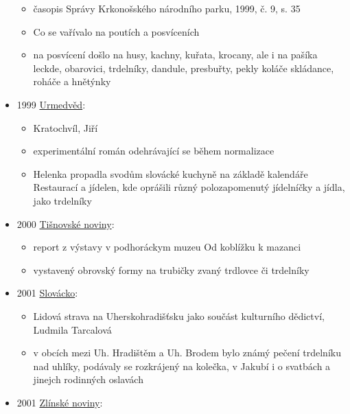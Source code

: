 \begin{itemize}
  \begin{itemize}
  \tightlist
  \item
    časopis Správy Krkonošského národního parku, 1999, č. 9, s. 35
  \item
    Co se vařívalo na poutích a posvíceních
  \item
    na posvícení došlo na husy, kachny, kuřata, krocany, ale i na pašíka
    leckde, obarovici, trdelníky, dandule, presbuřty, pekly koláče
    skládance, roháče a hnětýnky
  \end{itemize}
\item
  1999
  \href{https://ceskadigitalniknihovna.cz/uuid/uuid:b931b0f0-a760-11e7-ae0a-005056827e52}{Urmedvěd}:

  \begin{itemize}
  \tightlist
  \item
    Kratochvíl, Jiří
  \item
    experimentální román odehrávající se během normalizace
  \item
    Helenka propadla svodům slovácké kuchyně na základě kalendáře
    Restaurací a jídelen, kde oprášili různý polozapomenutý jídelníčky a
    jídla, jako trdelníky
  \end{itemize}
\item
  2000
  \href{https://ceskadigitalniknihovna.cz/view/uuid:a52ce0c6-2ad8-45b6-a768-ec516dd103f3?page=uuid\%3Af2321a13-5740-11e3-852c-0050569d679d&fulltext=trdeln\%C3\%ADk\%20OR\%20trdeln\%C3\%ADky\%20OR\%20trdeln\%C3\%ADk\%C5\%AF&source=mzk}{Tišnovské
  noviny}:

  \begin{itemize}
  \tightlist
  \item
    report z výstavy v podhoráckym muzeu Od koblížku k mazanci
  \item
    vystavený obrovský formy na trubičky zvaný trdlovce či trdelníky
  \end{itemize}
\item
  2001
  \href{https://ceskadigitalniknihovna.cz/view/uuid:a9321c14-1021-43dc-8103-3032373856fa?page=uuid\%3A85bc7b46-bf59-11ed-9fa2-001b63bd97ba&source=kfbz}{Slovácko}:

  \begin{itemize}
  \tightlist
  \item
    Lidová strava na Uherskohradišťsku jako součást kulturního dědictví,
    Ludmila Tarcalová
  \item
    v obcích mezi Uh. Hradištěm a Uh. Brodem bylo známý pečení trdelníku
    nad uhlíky, podávaly se rozkrájený na kolečka, v Jakubí i o svatbách
    a jinejch rodinných oslavách
  \end{itemize}
\item
  2001
  \href{https://ceskadigitalniknihovna.cz/view/uuid:322e701c-2381-435e-a7c8-e76568ab8a64?page=uuid:edf52cea-b1b8-11ed-8d8c-001b63bd97ba&fulltext=trdeln\%C3\%ADk\%20OR\%20trdeln\%C3\%ADky\%20OR\%20trdeln\%C3\%ADku\%20&source=kfbz}{Zlínské
  noviny}:


\end{itemize}
